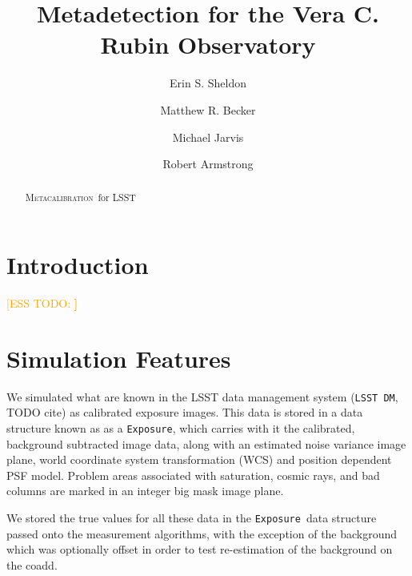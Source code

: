 \documentclass[iop, twocolappendix, appendixfloats, numberedappendix, apj]{hackemulateapj}
\newcommand{\esstodo}[1]{\textcolor{orange}{[ESS TODO: \bf #1]}}
\newcommand{\calexp}{\texttt{Exposure}}
\newcommand{\dm}{\texttt{LSST DM}}
\newcommand{\Mcal}{\textsc{Metacalibration}}
\newcommand{\Mdet}{\textsc{Metadetection}}
\begin{document}



\title{Metadetection for the Vera C. Rubin Observatory}

\author{Erin S. Sheldon}
\author{Matthew R. Becker}
\author{Michael Jarvis}
\author{Robert Armstrong}


\begin{abstract}

    \Mcal\ for LSST

\end{abstract}


\section{Introduction} \label{sec:intro}

\esstodo{}

\section{Simulation Features} \label{sec:sim}

We simulated what are known in the LSST data management system (\dm, TODO cite)
as calibrated exposure images.  This data is stored in a data structure known
as as a \calexp, which carries with it the calibrated, background subtracted
image data, along with an estimated noise variance image plane, world
coordinate system transformation (WCS) and position dependent PSF model.
Problem areas associated with saturation, cosmic rays, and bad columns are
marked in an integer big mask image plane.

We stored the true values for all these data in the \calexp\ data structure
passed onto the measurement algorithms, with the exception of the background
which was optionally offset in order to test re-estimation of the
background on the coadd.
\end{document}
